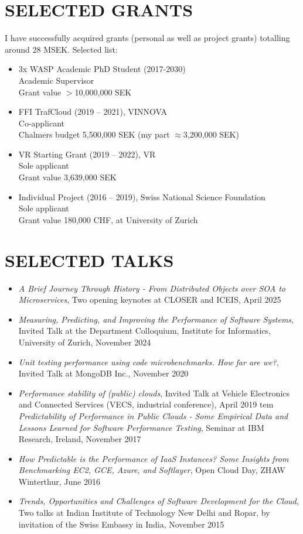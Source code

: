 \documentclass[paper=letter,fontsize=11pt]{scrartcl} %
\newcommand{\NewPart}[2]{\section*{\uppercase{#1} #2}}
\begin{document}
\newpage

\NewPart{Selected Grants}{}

I have successfully acquired grants (personal as well as project grants) totalling around 28 MSEK. Selected list:

\begin{itemize}
  \itemsep0em 
  \item 3x WASP Academic PhD Student (2017-2030)\\
  Academic Supervisor\\
  Grant value $>$10,000,000 SEK  
  \item FFI TrafCloud (2019 -- 2021), VINNOVA\\
	Co-applicant\\
	Chalmers budget 5,500,000 SEK (my part $\approx$3,200,000 SEK)
  \item VR Starting Grant (2019 -- 2022), VR\\
  Sole applicant\\
	Grant value 3,639,000 SEK
  \item Individual Project (2016 -- 2019), Swiss National Science Foundation\\
  Sole applicant \\
  Grant value 180,000 CHF, at University of Zurich
\end{itemize}

\NewPart{Selected Talks}{}

\begin{itemize}
  \itemsep0em 
  \item \emph{A Brief Journey Through History - From Distributed Objects over SOA to Microservices}, Two opening keynotes at CLOSER and ICEIS, April 2025
  \item \emph{Measuring, Predicting, and Improving the Performance of Software Systems}, Invited Talk at the Department Colloquium, Institute for Informatics, University of Zurich, November 2024
  \item \emph{Unit testing performance using code microbenchmarks. How far are we?}, Invited Talk at MongoDB Inc., November 2020
	\item \emph{Performance stability of (public) clouds}, Invited Talk at Vehicle Electronics and Connected Services (VECS, industrial conference), April 2019
	tem \emph{Predictability of Performance in Public Clouds - Some Empirical Data and Lessons Learned for Software Performance Testing}, Seminar at IBM Research, Ireland, November 2017
\item \emph{How Predictable is the Performance of IaaS Instances? Some Insights from Benchmarking EC2, GCE, Azure, and Softlayer}, Open Cloud Day, ZHAW Winterthur, June 2016
\item \emph{Trends, Opportunities and Challenges of Software Development for the Cloud}, Two talks at Indian Institute of Technology New Delhi and Ropar, by invitation of the Swiss Embassy in India, November 2015
\end{itemize}
\end{document}
